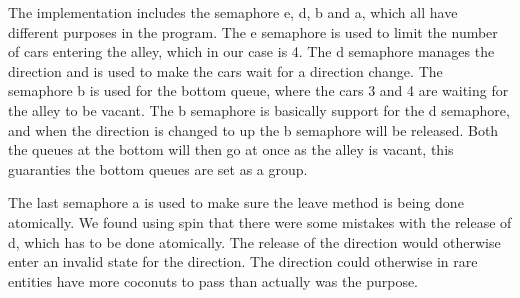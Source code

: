 The implementation includes the semaphore e, d, b and a, which all have different purposes in the program. The e semaphore is used to limit the number of cars entering the alley, which in our case is 4. The d semaphore manages the direction and is used to make the cars wait for a direction change. The semaphore b is used for the bottom queue, where the cars 3 and 4 are waiting for the alley to be vacant. The b semaphore is basically support for the d semaphore, and when the direction is changed to up the b semaphore will be released. Both the queues at the bottom will then go at once as the alley is vacant, this guaranties the bottom queues are set as a group.

The last semaphore a is used to make sure the leave method is being done atomically. We found using spin that there were some mistakes with the release of d, which has to be done atomically. The release of the direction would otherwise enter an invalid state for the direction. The direction could otherwise in rare entities have more coconuts to pass than actually was the purpose.